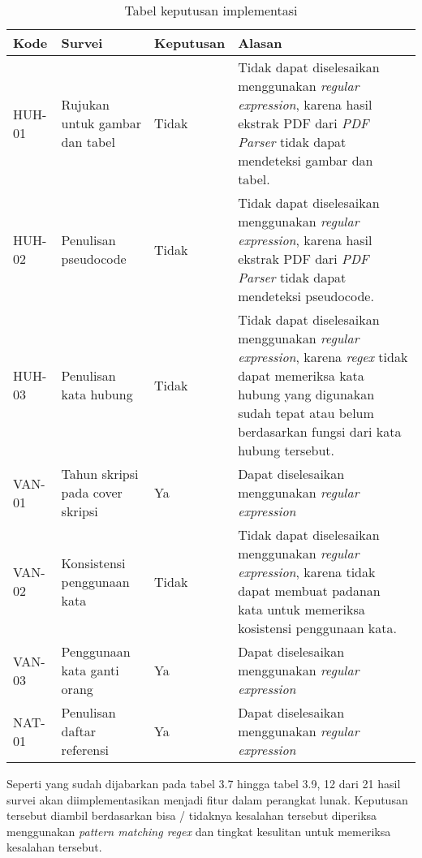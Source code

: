 \begin{table}[H]
	\caption {Tabel keputusan implementasi} \label{tab:keputusan}
	\begin{center}
		\begin{tabular}{|p{1.5 cm}|>{\raggedright} p{4 cm}| p{2 cm}| p{7 cm}|}
		\hline
		Kode & Survei & Keputusan & Alasan \\ 
		\hline
		HUH-01 & Rujukan untuk gambar dan tabel & Tidak & Tidak dapat diselesaikan menggunakan \textit{regular expression}, karena hasil ekstrak PDF dari \textit{PDF Parser} tidak dapat mendeteksi gambar dan tabel. \newline \\ 
		\hline 
		HUH-02 & Penulisan pseudocode & Tidak & Tidak dapat diselesaikan menggunakan \textit{regular expression}, karena hasil ekstrak PDF dari \textit{PDF Parser} tidak dapat mendeteksi pseudocode. \newline \\ 
		\hline 
		HUH-03 & Penulisan kata hubung & Tidak & Tidak dapat diselesaikan menggunakan \textit{regular expression}, karena \textit{regex} tidak dapat memeriksa kata hubung yang digunakan sudah tepat atau belum berdasarkan fungsi dari kata hubung tersebut. \newline \\ 
		\hline 
		VAN-01 & Tahun skripsi pada cover skripsi & Ya & Dapat diselesaikan menggunakan \textit{regular expression} \newline \\ 
		\hline 
		VAN-02 & Konsistensi penggunaan kata & Tidak & Tidak dapat diselesaikan menggunakan \textit{regular expression}, karena \newline tidak dapat membuat padanan kata untuk memeriksa kosistensi penggunaan kata. \\ 
		\hline 
		VAN-03 & Penggunaan kata ganti orang & Ya & Dapat diselesaikan menggunakan \textit{regular expression} \newline \\ 
		\hline 
		NAT-01 & Penulisan daftar referensi & Ya & Dapat diselesaikan menggunakan \textit{regular expression} \newline \\ 
		\hline
		\end{tabular}
	\end{center}
\end{table}

Seperti yang sudah dijabarkan pada tabel 3.7 hingga tabel 3.9, 12 dari 21 hasil survei akan diimplementasikan menjadi fitur dalam perangkat lunak. Keputusan tersebut diambil berdasarkan bisa / tidaknya kesalahan tersebut diperiksa menggunakan \textit{pattern matching regex} dan tingkat kesulitan untuk memeriksa kesalahan tersebut.